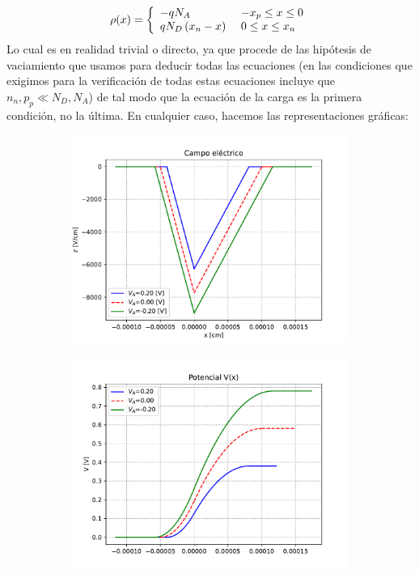 \begin{enumerate}[label=\alph*)]
    \begin{equation}
        \rho (x) = \left\lbrace \begin{array}{ll}
            - q N_A   & \ - x_p \leq x \leq 0 \\
            q N_D \left( x_n - x \right) & \ 0 \leq x \leq x_n \\
        \end{array} \right.
    \end{equation}
    Lo cual es en realidad trivial o directo, ya que procede de las hipótesis de vaciamiento que usamos para deducir todas las ecuaciones (en las condiciones que exigimos para la verificación de todas estas ecuaciones incluye que $n_n,p_p\ll N_D,N_A$) de tal modo que la ecuación de la carga es la primera condición, no la última. En cualquier caso, hacemos las representaciones gráficas:   
    \begin{figure}[h!]
    \centering
    \begin{subfigure}{0.47\textwidth}
        \includegraphics[width=\textwidth]{Cuerpo/Ch_03/03_04_E.pdf}
    \end{subfigure}
    \begin{subfigure}{0.47\textwidth}
        \includegraphics[width=\textwidth]{Cuerpo/Ch_03/03_05_V.pdf}

\end{subfigure}
\end{figure}
\end{enumerate}
